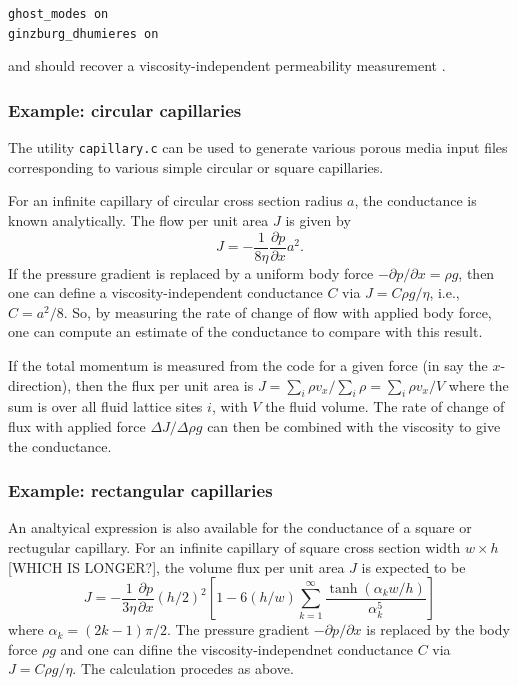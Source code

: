 \texttt{ghost\_modes on\\
ginzburg\_dhumieres on}

and should recover a viscosity-independent permeability measurement
\cite{lipanmiller,chunladd}.


\subsubsection{Example: circular capillaries}

The utility \texttt{capillary.c} can be used to generate various
porous media input files corresponding to various simple circular
or square capillaries.

For an infinite  capillary of circular cross section radius $a$,
the conductance is known analytically\cite{papanastasiou}. The
flow per unit area $J$ is given by
\begin{equation}
J = - \frac{1}{8\eta} \frac{\partial p}{ \partial x} a^2. 
\end{equation}
If the pressure gradient is replaced by a uniform body force
$-\partial p/ \partial x = \rho g$, then one can define a
viscosity-independent conductance $C$ via $ J = C \rho g / \eta$,
i.e., $C = a^2/8$. So, by measuring the rate of change of flow
with applied body force, one can compute an estimate of the conductance
to compare with this result.

If the total momentum is measured from the code for a given force
(in say the $x$-direction), then the flux per unit area is
$J = \sum_i \rho v_x / \sum_i \rho = \sum_i \rho v_x / V$
where the sum is over all fluid lattice sites $i$, with $V$
the fluid volume. The rate of change of flux with applied force
$\Delta J / \Delta\rho g$ can then be combined with the viscosity
to give the conductance.



\subsubsection{Example: rectangular capillaries}

An analtyical expression is also available for the conductance
of a square or rectugular capillary. For an infinite capillary
of square cross section width $w \times h$ [WHICH IS LONGER?],
the volume flux per unit area $J$ is expected to be
\cite{papanastasiou,edo1}
\begin{equation}
J = - \frac{1}{3\eta} \frac{\partial p}{\partial x} (h/2)^2
\left[
1 - 6(h/w) \sum_{k=1}^{\infty} \frac{\tanh(\alpha_k w/h)}{\alpha_k^5} 
\right]
\end{equation}
where $\alpha_k = (2k - 1)\pi/2$. The pressure gradient
$-\partial p / \partial x$ is replaced by the body force $\rho g$ and
one can difine the viscosity-independnet conductance $C$ via
$J = C\rho g / \eta$. The calculation procedes as above.

